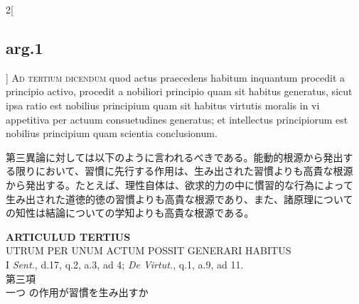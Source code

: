 \documentclass[paper=a4paper,fontsize=10pt,jafontsize=9pt,titlepage]{jlreq}
\begin{document}
\begin{paracol}{2}[\subsection{arg.1}]
{\scshape Ad tertium dicendum} quod actus praecedens habitum inquantum
procedit a principio activo, procedit a nobiliori principio quam sit
habitus generatus, sicut ipsa ratio est nobilius principium quam sit
habitus virtutis moralis in vi appetitiva per actuum consuetudines
generatus; et intellectus principiorum est nobilius principium quam
scientia conclusionum.

\switchcolumn

第三異論に対しては以下のように言われるべきである。能動的根源から発出す
る限りにおいて、習慣に先行する作用は、生み出された習慣よりも高貴な根源
から発出する。たとえば、理性自体は、欲求的力の中に慣習的な行為によって
生み出された道徳的徳の習慣よりも高貴な根源であり、また、諸原理について
の知性は結論についての学知よりも高貴な根源である。

\end{paracol}
\newpage
{}
{}
\setcounter{section}{3}
\setcounter{subsection}{0}


\begin{center}
{\Large {\bfseries ARTICULUD TERTIUS}}\\ {\large UTRUM PER UNUM ACTUM POSSIT
GENERARI HABITUS}\\ {\footnotesize I {\itshape Sent.}, d.17, q.2, a.3,
ad 4; {\itshape De Virtut.}, q.1, a.9, ad 11.}\\ {\Large 第三項\\一つ
の作用が習慣を生み出すか}
\end{center}
\end{document}
